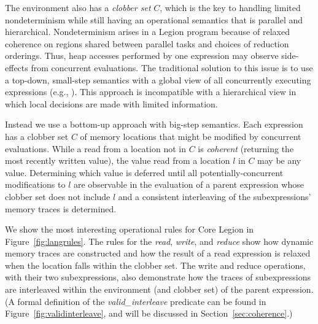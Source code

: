 The environment also has a {\em clobber set} $C$, which is the key to handling
limited nondeterminism  while still having an operational
semantics that is parallel and hierarchical.  Nondeterminism arises in a Legion
program because of relaxed coherence on
regions shared between parallel tasks and choices of reduction orderings.
Thus, heap accesses performed by one expression may observe side-effects from 
concurrent evaluations.  The traditional solution to this issue
is to use a top-down, small-step semantics with a global view of all concurrently executing expressions (e.g., \cite{CML}).  
This approach is incompatible with a hierarchical view in which local
decisions are made with limited information.

Instead we use a bottom-up approach with big-step semantics.
Each expression has a clobber set $C$ of memory locations that might 
be modified by concurrent evaluations.  While a read from a location not in $C$ is {\em coherent}
(returning the most recently written value), the value read from a location $l$ in $C$ may be any
value.  Determining which value is deferred until all potentially-concurrent
modifications to $l$ are observable in the evaluation of a parent expression whose clobber set does
not include $l$ and a consistent interleaving of the subexpressions' memory traces is determined.


We show the most interesting operational rules for Core Legion in
Figure~\ref{fig:langrules}.  The rules for the {\em read}, {\em
write}, and {\em reduce} show how dynamic memory traces are
constructed and how the result of a read expression is relaxed when
the location falls within the clobber set.  The write
and reduce operations, with their two subexpressions, also demonstrate how
the traces of subexpressions are interleaved within the environment
(and clobber set) of the parent expression.  (A formal definition of
the {\em valid\_interleave} predicate can be found in
Figure~\ref{fig:validinterleave}, and will be discussed in
Section~\ref{sec:coherence}.)

